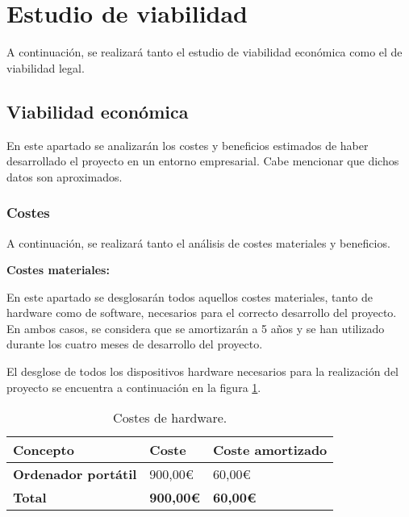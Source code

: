 \section{Estudio de viabilidad}\label{estudio-de-viabilidad}

A continuación, se realizará tanto el estudio de viabilidad económica como el de viabilidad legal.

\subsection{Viabilidad económica}\label{viabilidad-economica}

En este apartado se analizarán los costes y beneficios estimados de haber desarrollado el proyecto en un entorno empresarial. Cabe mencionar que dichos datos son aproximados.

\subsubsection{Costes}\label{costes}

A continuación, se realizará tanto el análisis de costes materiales y beneficios.

\textbf{Costes materiales:}

En este apartado se desglosarán todos aquellos costes materiales, tanto de hardware como de software, necesarios para el correcto desarrollo del proyecto. En ambos casos, se considera que se amortizarán a 5 años y se han utilizado durante los cuatro meses de desarrollo del proyecto.

El desglose de todos los dispositivos hardware necesarios para la realización del proyecto se encuentra a continuación en la figura \ref{tabla:costes-de-hardware}.

\begin{table}[h!]
    \centering
    \begin{tabular}{l l l}
        \hline
        \textbf{Concepto}               & \textbf{Coste}    & \textbf{Coste amortizado} \\
        \hline
        \textbf{Ordenador portátil}     & 900,00€           & 60,00€                    \\
        \hline
        \textbf{Total}                  & \textbf{900,00€}  & \textbf{60,00€}           \\
        \hline
    \end{tabular}
    \caption{Costes de hardware.}\label{tabla:costes-de-hardware}
\end{table}

